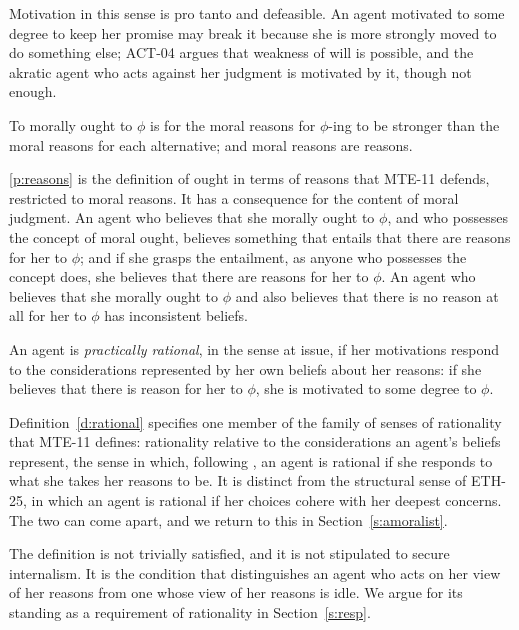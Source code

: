 \documentclass{situationist-preprint}
\begin{document}
Motivation in this sense is pro tanto and defeasible. An agent motivated to some degree to keep her promise may break it because she is more strongly moved to do something else; ACT-04 argues that weakness of will is possible, and the akratic agent who acts against her judgment is motivated by it, though not enough.

\begin{principle}\label{p:reasons}
To morally ought to $\phi$ is for the moral reasons for $\phi$-ing to be stronger than the moral reasons for each alternative; and moral reasons are reasons.
\end{principle}

\ref{p:reasons} is the definition of ought in terms of reasons that MTE-11 defends, restricted to moral reasons. It has a consequence for the content of moral judgment. An agent who believes that she morally ought to $\phi$, and who possesses the concept of moral ought, believes something that entails that there are reasons for her to $\phi$; and if she grasps the entailment, as anyone who possesses the concept does, she believes that there are reasons for her to $\phi$. An agent who believes that she morally ought to $\phi$ and also believes that there is no reason at all for her to $\phi$ has inconsistent beliefs.

\begin{definition}\label{d:rational}
An agent is \emph{practically rational}, in the sense at issue, if her motivations respond to the considerations represented by her own beliefs about her reasons: if she believes that there is reason for her to $\phi$, she is motivated to some degree to $\phi$.
\end{definition}

Definition~\ref{d:rational} specifies one member of the family of senses of rationality that MTE-11 defines: rationality relative to the considerations an agent's beliefs represent, the sense in which, following \citet{Parfit2011}, an agent is rational if she responds to what she takes her reasons to be. It is distinct from the structural sense of ETH-25, in which an agent is rational if her choices cohere with her deepest concerns. The two can come apart, and we return to this in Section~\ref{s:amoralist}.

The definition is not trivially satisfied, and it is not stipulated to secure internalism. It is the condition that distinguishes an agent who acts on her view of her reasons from one whose view of her reasons is idle. We argue for its standing as a requirement of rationality in Section~\ref{s:resp}.
\end{document}

